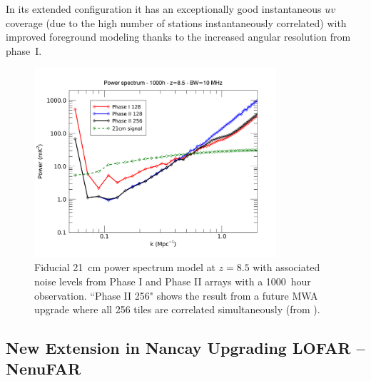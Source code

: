 In its extended configuration it has an exceptionally good instantaneous $uv$ coverage (due to the high number of stations instantaneously correlated) with improved foreground modeling thanks to the increased angular resolution from phase~I.
%
\begin{figure}[t]
\begin{center}
\includegraphics[width=0.8\textwidth]{Koopmans_Bernardi/mwa_phaseII_pspec.png}
\end{center}
\caption{Fiducial 21~cm power spectrum model at $z = 8.5$ with associated noise levels from Phase I and Phase II arrays with a 1000~hour observation. ``Phase II 256" shows the result from a future MWA upgrade where all 256 tiles are correlated simultaneously (from \cite{wayth18}).}
\label{fig:fig_mwa_phaseII_pspec}
\end{figure}




\subsection{New Extension in Nancay Upgrading LOFAR -- NenuFAR}

